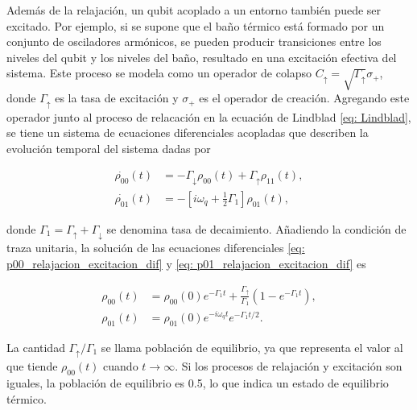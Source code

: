 Además de la relajación, un qubit acoplado a un entorno también puede ser excitado. Por ejemplo, si se supone que el baño térmico está formado por un conjunto de osciladores armónicos, se pueden producir transiciones entre los niveles del qubit y los niveles del baño, resultado en una excitación efectiva del sistema. Este proceso se modela como un operador de colapso \(C_\uparrow = \sqrt{\Gamma_\uparrow} \sigma_+\), donde \(\Gamma_\uparrow\) es la tasa de excitación y \(\sigma_+\) es el operador de creación. Agregando este operador junto al proceso de relacación en la ecuación de Lindblad \ref{eq: Lindblad}, se tiene un sistema de ecuaciones diferenciales acopladas que describen la evolución temporal del sistema dadas por

\begin{align}
    \dot{\rho_{00}}(t) &= -\Gamma_\downarrow \rho_{00}(t) + \Gamma_\uparrow \rho_{11}(t), \label{eq: p00_relajacion_excitacion_dif} \\
    \dot{\rho_{01}}(t) &= -\left[i \omega_q + \frac{1}{2}\Gamma_1 \right] \rho_{01}(t), \label{eq: p01_relajacion_excitacion_dif}
\end{align}

\noindent donde \(\Gamma_1 = \Gamma_\uparrow + \Gamma_\downarrow\) se denomina tasa de decaimiento. Añadiendo la condición de traza unitaria, la solución de las ecuaciones diferenciales \ref{eq: p00_relajacion_excitacion_dif} y \ref{eq: p01_relajacion_excitacion_dif} es

\begin{align}
    \rho_{00}(t) &= \rho_{00}(0) e^{-\Gamma_1 t} + \frac{\Gamma_\uparrow}{\Gamma_1} \left(1 - e^{-\Gamma_1 t} \right), \label{eq: p00_relajacion_excitacion_sol} \\
    \rho_{01}(t) &= \rho_{01}(0) e^{-i \omega_q t} e^{-\Gamma_1 t / 2} \label{eq: p01_relajacion_excitacion_sol}.
\end{align}


La cantidad \(\Gamma_\uparrow/\Gamma_1\) se llama población de equilibrio, ya que representa el valor al que tiende \(\rho_{00}(t)\) cuando \(t \rightarrow \infty\). Si los procesos de relajación y excitación son iguales, la población de equilibrio es 0.5, lo que indica un estado de equilibrio térmico. 

